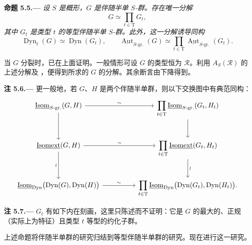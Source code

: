 \par\medskip\noindent{}\textbf{命题 5.5.---}\enspace
\emph{设 \(S\) 是概形，\(G\) 是伴随半单 \(S\)-群。存在唯一分解}
\[
  G\simeq\prod_{t\in\mathrm T}G_t,
\]
\emph{其中 \(G_t\) 是类型 \(t\) 的等型伴随半单 \(S\)-群。此外，这一分解诱导同构}
\[
  \operatorname{Dyn}_t(G)\simeq\operatorname{Dyn}(G_t),
  \qquad
  \underline{\operatorname{Aut}}_{S\text{-}\mathrm{gr.}}(G)
  \simeq
  \prod_{t\in\mathrm T}
  \underline{\operatorname{Aut}}_{S\text{-}\mathrm{gr.}}(G_t).
\]

当 \(G\) 分裂时，已在上面证明。一般情形可设 \(G\) 的类型恒为 \(\mathscr R\)。利用 \(A_S(\mathscr R)\) 的上述分解及 ，便得到所求的 \(G\) 的分解。其余断言由下降得到。

\par\medskip\noindent{}\textbf{注 5.6.---}\enspace
更一般地，若 \(G\)、\(H\) 是两个伴随半单群，则以下交换图中有典范同构：
\[
\begin{tikzcd}[column sep=huge,row sep=large]
\underline{\operatorname{Isom}}_{S\text{-}\mathrm{gr.}}(G,H)
  \arrow[r,"\sim"] \arrow[d]
&
\displaystyle\prod_{t\in\mathrm T}
\underline{\operatorname{Isom}}_{S\text{-}\mathrm{gr.}}(G_t,H_t)
  \arrow[d]
\\
\underline{\operatorname{Isomext}}(G,H)
  \arrow[r,"\sim"] \arrow[d,"\wr"']
&
\displaystyle\prod_{t\in\mathrm T}
\underline{\operatorname{Isomext}}(G_t,H_t)
  \arrow[d,"\wr"]
\\
\underline{\operatorname{Isom}}_{\mathrm{Dyn}}
  \bigl(\operatorname{Dyn}(G),\operatorname{Dyn}(H)\bigr)
  \arrow[r,"\sim"]
&
\displaystyle\prod_{t\in\mathrm T}
\underline{\operatorname{Isom}}_{\mathrm{Dyn}}
  \bigl(\operatorname{Dyn}(G_t),\operatorname{Dyn}(H_t)\bigr).
\end{tikzcd}
\]

\par\medskip\noindent{}\textbf{注 5.7.---}\enspace
\(G_t\) 有如下内在刻画，这里只陈述而不证明：它是 \(G\) 的最大的、正规（实际上为特征）且类型 \(t\) 等型的约化子群。

上述命题将伴随半单群的研究归结到等型伴随半单群的研究。现在进行这一研究。

